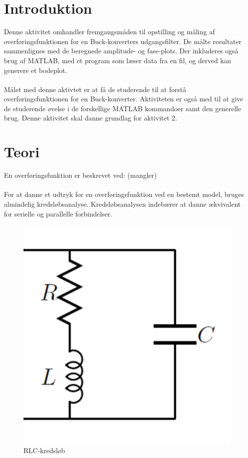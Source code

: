 \section{Introduktion}\label{sec:intro}
Denne aktivitet omhandler fremgangsmåden til opstilling og måling af overføringsfunktionen for en Buck-konverters udgangsfilter. De målte resultater sammenlignes med de beregnede amplitude- og fase-plots. Der inkluderes også brug af MATLAB, med et program som læser data fra en fil, og derved kan generere et bodeplot. \\
\\
Målet med denne aktivtet er at få de studerende til at forstå overføringsfunktionen for en Buck-konverter. Aktiviteten er også med til at give de studerende øvelse i de forskellige MATLAB kommandoer samt den generelle brug. Denne aktivitet skal danne grundlag for aktivitet 2. 

\section{Teori}\label{sec:teori}
En overføringsfunktion er beskrevet ved: (mangler)\\
\\
For at danne et udtryk for en overføringsfunktion ved en bestemt model, bruges almindelig kredsløbsanalyse. Kredsløbsanalysen indebærer at danne ækvivalent for serielle og parallelle forbindelser.

\begin{figure}[h!]
	\centering
	\includegraphics[width=.3\textwidth]{reg1/rlc.png}
	\caption{RLC-kredsløb}
	\label{fig:rlc}
\end{figure}